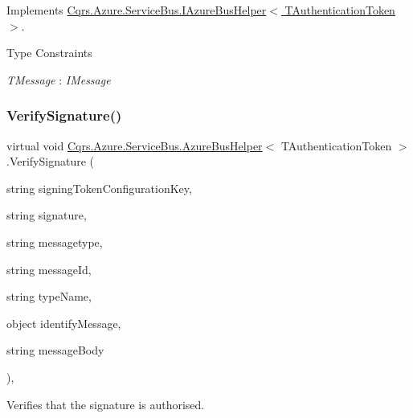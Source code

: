 Implements \hyperlink{interfaceCqrs_1_1Azure_1_1ServiceBus_1_1IAzureBusHelper_a1fe0ff74b4e5cce3d0b5a81dbaa273e0_a1fe0ff74b4e5cce3d0b5a81dbaa273e0}{Cqrs.\+Azure.\+Service\+Bus.\+I\+Azure\+Bus\+Helper$<$ T\+Authentication\+Token $>$}.

\begin{Desc}
\item[Type Constraints]\begin{description}
\item[{\em T\+Message} : {\em I\+Message}]\end{description}
\end{Desc}
\mbox{\label{classCqrs_1_1Azure_1_1ServiceBus_1_1AzureBusHelper_a6f35e150ca60f71a73c2f9a6e03f9f56_a6f35e150ca60f71a73c2f9a6e03f9f56}} 
\subsubsection{\texorpdfstring{Verify\+Signature()}{VerifySignature()}}
{\footnotesize\ttfamily virtual void \hyperlink{classCqrs_1_1Azure_1_1ServiceBus_1_1AzureBusHelper}{Cqrs.\+Azure.\+Service\+Bus.\+Azure\+Bus\+Helper}$<$ T\+Authentication\+Token $>$.Verify\+Signature (\begin{DoxyParamCaption}\item[{string}]{signing\+Token\+Configuration\+Key,  }\item[{string}]{signature,  }\item[{string}]{messagetype,  }\item[{string}]{message\+Id,  }\item[{string}]{type\+Name,  }\item[{object}]{identify\+Message,  }\item[{string}]{message\+Body }\end{DoxyParamCaption})\hspace{0.3cm}{\ttfamily [protected]}, {\ttfamily [virtual]}}



Verifies that the signature is authorised. 



